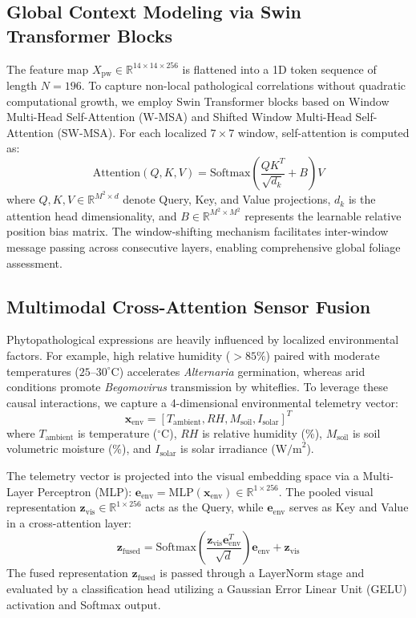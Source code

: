 \documentclass[conference]{IEEEtran}
\begin{document}
\subsection{Global Context Modeling via Swin Transformer Blocks}
The feature map $X_{\text{pw}} \in \mathbb{R}^{14 \times 14 \times 256}$ is flattened into a 1D token sequence of length $N = 196$. To capture non-local pathological correlations without quadratic computational growth, we employ Swin Transformer blocks based on Window Multi-Head Self-Attention (W-MSA) and Shifted Window Multi-Head Self-Attention (SW-MSA). For each localized $7 \times 7$ window, self-attention is computed as:
\begin{equation}
\text{Attention}(Q, K, V) = \text{Softmax}\left(\frac{QK^T}{\sqrt{d_k}} + B\right)V
\label{eq:swin_attn}
\end{equation}
where $Q, K, V \in \mathbb{R}^{M^2 \times d}$ denote Query, Key, and Value projections, $d_k$ is the attention head dimensionality, and $B \in \mathbb{R}^{M^2 \times M^2}$ represents the learnable relative position bias matrix. The window-shifting mechanism facilitates inter-window message passing across consecutive layers, enabling comprehensive global foliage assessment.

\subsection{Multimodal Cross-Attention Sensor Fusion}
Phytopathological expressions are heavily influenced by localized environmental factors. For example, high relative humidity ($>85\%$) paired with moderate temperatures ($25$--$30^\circ\text{C}$) accelerates \textit{Alternaria} germination, whereas arid conditions promote \textit{Begomovirus} transmission by whiteflies. To leverage these causal interactions, we capture a 4-dimensional environmental telemetry vector:
\begin{equation}
\mathbf{x}_{\text{env}} = [T_{\text{ambient}}, RH, M_{\text{soil}}, I_{\text{solar}}]^T
\end{equation}
where $T_{\text{ambient}}$ is temperature ($^\circ\text{C}$), $RH$ is relative humidity (\%), $M_{\text{soil}}$ is soil volumetric moisture (\%), and $I_{\text{solar}}$ is solar irradiance ($\text{W/m}^2$).

The telemetry vector is projected into the visual embedding space via a Multi-Layer Perceptron (MLP): $\mathbf{e}_{\text{env}} = \text{MLP}(\mathbf{x}_{\text{env}}) \in \mathbb{R}^{1 \times 256}$. The pooled visual representation $\mathbf{z}_{\text{vis}} \in \mathbb{R}^{1 \times 256}$ acts as the Query, while $\mathbf{e}_{\text{env}}$ serves as Key and Value in a cross-attention layer:
\begin{equation}
\mathbf{z}_{\text{fused}} = \text{Softmax}\left(\frac{\mathbf{z}_{\text{vis}} \mathbf{e}_{\text{env}}^T}{\sqrt{d}}\right) \mathbf{e}_{\text{env}} + \mathbf{z}_{\text{vis}}
\label{eq:cross_attn}
\end{equation}
The fused representation $\mathbf{z}_{\text{fused}}$ is passed through a LayerNorm stage and evaluated by a classification head utilizing a Gaussian Error Linear Unit (GELU) activation and Softmax output.
\end{document}

